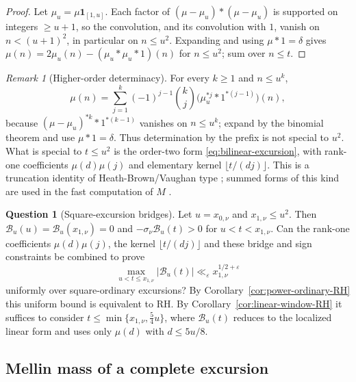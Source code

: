 \documentclass[11pt]{amsart}
\numberwithin{equation}{section}
\theoremstyle{plain}
\theoremstyle{definition}
\newtheorem{question}[theorem]{Question}
\theoremstyle{remark}
\newtheorem{remark}[theorem]{Remark}
\newcommand{\eps}{\varepsilon}
\begin{document}
\begin{proof}
Let $\mu_u=\mu\mathbf1_{[1,u]}$. Each factor of $(\mu-\mu_u)*(\mu-\mu_u)$ is
supported on integers $\ge u+1$, so the convolution, and its convolution
with $1$, vanish on $n<(u+1)^2$, in particular on $n\le u^2$. Expanding and using $\mu*1=\delta$ gives
$\mu(n)=2\mu_u(n)-(\mu_u*\mu_u*1)(n)$ for $n\le u^2$; sum over $n\le t$.
\end{proof}

\begin{remark}[Higher-order determinacy]
\label{rem:prefix-k}
For every $k\ge1$ and $n\le u^k$,
\begin{equation}
\label{eq:HB-k}
\mu(n)=\sum_{j=1}^{k}(-1)^{j-1}\binom{k}{j}
\bigl(\mu_u^{*j}*1^{*(j-1)}\bigr)(n),
\end{equation}
because $(\mu-\mu_u)^{*k}*1^{*(k-1)}$ vanishes on $n\le u^k$; expand by the
binomial theorem and use $\mu*1=\delta$. Thus determination by the prefix
is not special to $u^2$. What is special to $t\le u^2$ is the order-two form
\eqref{eq:bilinear-excursion}, with rank-one coefficients $\mu(d)\mu(j)$ and
elementary kernel $\lfloor t/(dj)\rfloor$. This is a truncation identity of
Heath-Brown/Vaughan type \cite{HB82}; summed forms of this kind are used in
the fast computation of $M$ \cite{HT23}.
\end{remark}

\begin{question}[Square-excursion bridges]
\label{q:excursion-constraint}
Let $u=x_{0,\nu}$ and $x_{1,\nu}\le u^2$. Then
$\mathcal B_u(u)=\mathcal B_u(x_{1,\nu})=0$ and
$-\sigma_\nu\mathcal B_u(t)>0$ for $u<t<x_{1,\nu}$. Can the rank-one
coefficients $\mu(d)\mu(j)$, the kernel $\lfloor t/(dj)\rfloor$ and these
bridge and sign constraints be combined to prove
\[
\max_{u<t\le x_{1,\nu}}|\mathcal B_u(t)|
\ll_\eps x_{1,\nu}^{1/2+\eps}
\]
uniformly over square-ordinary excursions? By
Corollary~\ref{cor:power-ordinary-RH} this uniform bound is equivalent to
RH. By Corollary~\ref{cor:linear-window-RH} it suffices to consider
$t\le\min\{x_{1,\nu},\frac54u\}$, where $\mathcal B_u(t)$ reduces to
the localized linear form and uses only $\mu(d)$ with $d\le5u/8$.
\end{question}

\subsection{Mellin mass of a complete excursion}
\end{document}
